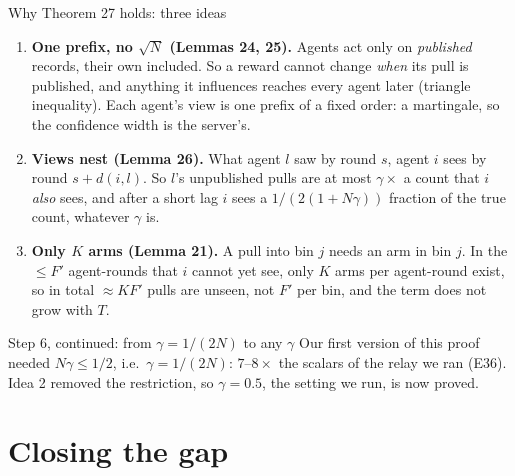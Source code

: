 \documentclass[11pt]{beamer}
\begin{document}
\begin{frame}{Why Theorem 27 holds: three ideas}
\footnotesize
\begin{enumerate}
\setlength{\itemsep}{0.4em}
\item \textbf{One prefix, no $\sqrt N$ (Lemmas 24, 25).} Agents act only on \emph{published} records, their own included. So a reward cannot change \emph{when} its pull is published, and anything it influences reaches every agent later (triangle inequality). Each agent's view is one prefix of a fixed order: a martingale, so the confidence width is the server's.
\item \textbf{Views nest (Lemma 26).} What agent $l$ saw by round $s$, agent $i$ sees by round $s+d(i,l)$. So $l$'s unpublished pulls are at most $\gamma\times$ a count that $i$ \emph{also} sees, and after a short lag $i$ sees a $1/(2(1{+}N\gamma))$ fraction of the true count, whatever $\gamma$ is.
\item \textbf{Only $K$ arms (Lemma 21).} A pull into bin $j$ needs an arm in bin $j$. In the $\le F'$ agent-rounds that $i$ cannot yet see, only $K$ arms per agent-round exist, so in total $\approx KF'$ pulls are unseen, not $F'$ per bin, and the term does not grow with $T$.
\end{enumerate}
\vspace{0.3em}
\begin{alertblock}{Step 6, continued: from $\gamma=1/(2N)$ to any $\gamma$}
Our first version of this proof needed $N\gamma\le1/2$, i.e.\ $\gamma=1/(2N)$: $7$--$8\times$ the scalars of the relay we ran (E36). Idea 2 removed the restriction, so $\gamma=0.5$, the setting we run, is now proved.
\end{alertblock}
\end{frame}

\section{Closing the gap}
\end{document}
